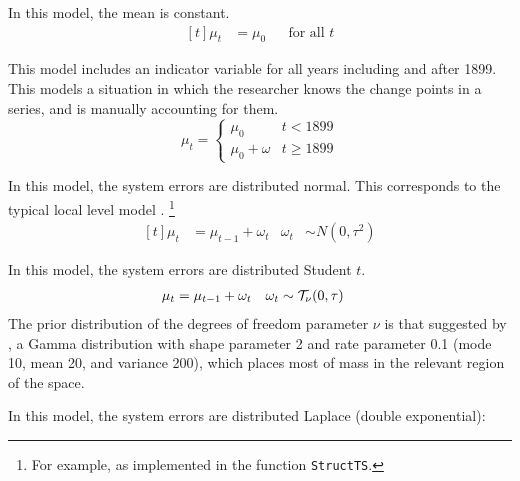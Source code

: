 \begin{description}[font = \normalfont\ModelII]
\item[Constant] In this model, the mean is constant.
  \begin{equation}
    \label{dlm:eq:21}
    \begin{aligned}[t]
      \mu_{t} &= \mu_{0} && \text{for all $t$}
    \end{aligned}
  \end{equation}
\item[Intervention] This model includes an indicator variable for all years including and after 1899.
  This models a situation in which the researcher knows the change points in a series, and is manually accounting for them.
  \begin{equation}
    \mu_{t} = 
    \begin{cases}
      \mu_{0} & t < 1899 \\
      \mu_{0} + \omega & t \geq 1899
    \end{cases}
  \end{equation}
\item[Normal] In this model, the system errors are distributed normal.
  This corresponds to the typical local level model \parencites[Ch. 2]{DurbinKoopman2012}[Ch. 2]{WestHarrison1997}.%
  \footnote{For example, as implemented in the \RLang{} function \texttt{StructTS}.}
  \begin{equation}
    \label{dlm:eq:11}
    \begin{aligned}[t]
      \mu_{t} &= \mu_{t - 1} + \omega_{t} & \omega_{t} & \sim N(0, \tau^{2})
    \end{aligned}
  \end{equation}
\item[StudentT] In this model, the system errors are distributed Student $t$.
  \begin{equation}
    \label{dlm:eq:18}
    \begin{aligned}[t]
      \mu_{t} &= \mu_{t - 1} + \omega_{t} & \omega_{t} & \sim \mathcal{T}_{\nu}\mathopen{}\left(0, \tau\right)\mathclose{}
    \end{aligned}
  \end{equation}
  The prior distribution of the degrees of freedom parameter $\nu$ is that suggested by \textcites{JuarezSteel2010b}, a Gamma distribution with shape parameter 2 and rate parameter 0.1 (mode 10, mean 20, and variance 200), which places most of mass in the relevant region of the space.
\item[Laplace] In this model, the system errors are distributed Laplace (double exponential):

\end{description}

